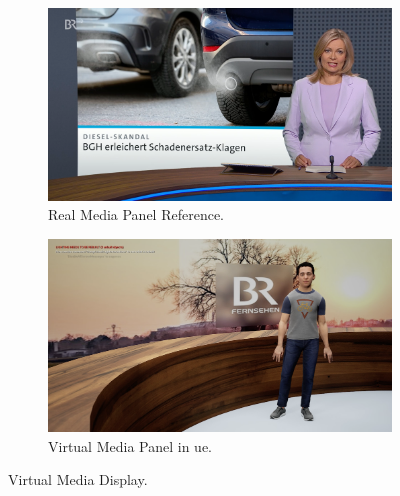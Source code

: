 \documentclass[
  a4paper,  %
  twoside,  %
  bibliography=totoc,
  headsepline,
  cleardoublepage=empty,
  parskip=half,
  draft=false
]{scrbook}
\begin{document}
\begin{figure}[h]
  \centering
  \begin{subfigure}{0.45\textwidth}
    \includegraphics[width=\linewidth]{graphics/unreal-engine/media/slide-real.png}
    \caption{Real Media Panel Reference.}
  \end{subfigure}
  \begin{subfigure}{0.45\textwidth}
    \includegraphics[width=\linewidth]{graphics/unreal-engine/media/slide-inplace.png}
    \caption{Virtual Media Panel in \gls{ue}.}
  \end{subfigure}
  \caption{Virtual Media Display.}
  \label{fig:ue-media}
\end{figure}
\end{document}

